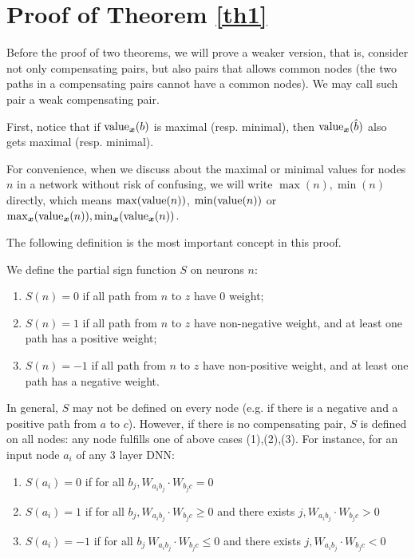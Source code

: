 	\section{Proof of Theorem \ref{th1}}	

Before the proof of two theorems, we will prove a weaker version, that is, consider not only compensating pairs, but also pairs that allows common nodes (the two paths in a compensating pairs cannot have a common nodes). We may call such pair a weak compensating pair.


First, notice that if ${\textrm{value}}_{\boldsymbol{x}}(b)$ is maximal (resp. minimal), 
then ${\textrm{value}}_{\boldsymbol{x}}(\hat{b})$ also gets maximal (resp. minimal). 

For convenience, when we discuss about the maximal or minimal values for nodes $n$ in a network without risk of confusing, we will write $\max(n),\min(n)$ directly, which means $\max({\textrm{value}}(n))$, $\min({\textrm{value}}(n))$ or $\max_{\boldsymbol{x}}({\textrm{value}}_{\boldsymbol{x}}(n)),\min_{\boldsymbol{x}}({\textrm{value}}_{\boldsymbol{x}}(n))$.


The following definition is the most important concept in this proof.

\begin{definition}\label{sign_of_nodes}
	We define the partial sign function $S$ on neurons $n$: 	
	\begin{enumerate}
		\item $S(n)=0$ if all path from $n$ to $z$ have 0 weight; 
		\item $S(n)=1$ if all path from $n$ to $z$ have non-negative weight, and at least one path has a positive weight; 
		\item $S(n)=-1$ if all path from $n$ to $z$ have non-positive weight, and at least one path has a negative weight. 
	\end{enumerate}
\end{definition}

In general, $S$ may not be defined on every node (e.g. if there is a negative and a positive path from $a$ to $c$). However, if there is no compensating pair, $S$ is defined on all nodes: any node fulfills one of above cases (1),(2),(3).
For instance, for an input node $a_i$ of any 3 layer DNN:
\begin{enumerate}
	\item  $S(a_i)=0$ if 
	for all $b_j, W_{a_i b_j}\cdot W_{b_j c} = 0$
	
	
	\item  $S(a_i)=1$ if for all $b_j, W_{a_i b_j}\cdot W_{b_j c} \geq 0$ and there exists 
	$j, W_{a_i b_j}\cdot W_{b_j c} > 0$
	
	\item $S(a_i)=-1$ if for all $b_j\ W_{a_i b_j}\cdot W_{b_j c} \leq 0$ and there exists 
	$j, W_{a_i b_j}\cdot W_{b_j c} < 0$ 
\end{enumerate}

